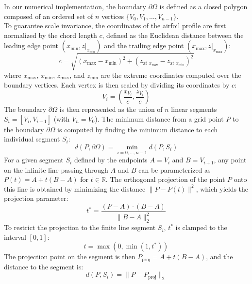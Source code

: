 In our numerical implementation, the boundary $\partial\Omega$ is defined as a closed polygon composed of an ordered set of $n$ vertices $\{V_0, V_1, \dots, V_{n-1}\}$.\\
To guarantee scale invariance, the coordinates of the airfoil profile are first normalized by the chord length $c$, defined as the Euclidean distance between the leading edge point $(x_{\min}, z|_{x_{\min}})$ and the trailing edge point $(x_{\max}, z|_{x_{\max}})$:
\begin{equation}
 c = \sqrt{(x_{\max} - x_{\min})^2 + (z_{\text{at } x_{\max}} - z_{\text{at } x_{\min}})^2}
\end{equation}
where $x_{\max}$, $x_{\min}$, $z_{\max}$, and $z_{\min}$ are the extreme coordinates computed over the boundary vertices. Each vertex is then scaled by dividing its coordinates by $c$:
\begin{equation}
    V_i = \left(\frac{x_{V_i}}{c}, \frac{z_{V_i}}{c}\right)
\end{equation}
The boundary $\partial\Omega$ is then represented as the union of $n$ linear segments $S_i = [V_i, V_{i+1}]$ (with $V_n = V_0$). The minimum distance from a grid point $P$ to the boundary $\partial\Omega$ is computed by finding the minimum distance to each individual segment $S_i$:
\begin{equation}
    d(P, \partial\Omega) = \min_{i=0, \dots, n-1} d(P, S_i)
\end{equation}
For a given segment $S_i$ defined by the endpoints $A = V_i$ and $B = V_{i+1}$, any point on the infinite line passing through $A$ and $B$ can be parameterized as $P(t) = A + t(B-A)$ for $t \in \mathbb{R}$. The orthogonal projection of the point $P$ onto this line is obtained by minimizing the distance $\|P - P(t)\|^2$, which yields the projection parameter:
\begin{equation}
    t^* = \frac{(P - A) \cdot (B - A)}{\|B - A\|_2^2}
    \label{eq:03_orthogonal_projection}
\end{equation}
To restrict the projection to the finite line segment $S_i$, $t^*$ is clamped to the interval $[0, 1]$:
\begin{equation}
    t = \max\left(0, \min\left(1, t^*\right)\right)
    \label{eq:03_clamping}
\end{equation}
The projection point on the segment is then $P_{\text{proj}} = A + t(B-A)$, and the distance to the segment is:
\begin{equation}
    d(P, S_i) = \|P - P_{\text{proj}}\|_2
\end{equation}

